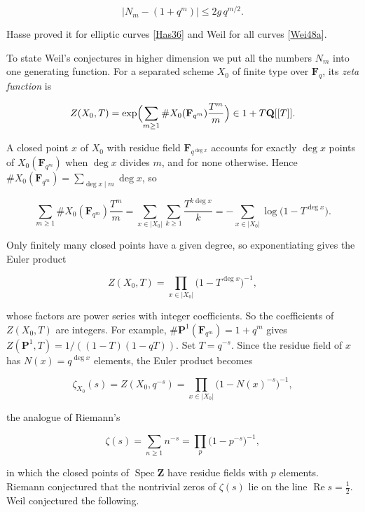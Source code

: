 \documentclass[11pt]{article}
\begin{document}
\[
|N_m-(1+q^m)|\le 2g\,q^{m/2}.
\]

Hasse proved it for elliptic curves [\hyperref[bp21]{Has36}] and Weil for all curves [\hyperref[bp22]{Wei48a}].

To state Weil's conjectures in higher dimension we put all the numbers \(N_m\) into one generating function. For a separated scheme \(X_0\) of finite type over \(\mathbf F_q\), its \emph{zeta function} is

\[
Z(X_0,T)=\exp\Bigl(\sum_{m\ge 1}\#X_0(\mathbf F_{q^m})\frac{T^m}{m}\Bigr)
\in 1+T\mathbf Q[[T]].
\]

A closed point \(x\) of \(X_0\) with residue field \(\mathbf F_{q^{\deg x}}\) accounts for exactly \(\deg x\) points of \(X_0(\mathbf F_{q^m})\) when \(\deg x\) divides \(m\), and for none otherwise. Hence \(\#X_0(\mathbf F_{q^m})=\sum_{\deg x\mid m}\deg x\), so

\[
\sum_{m\ge1}\#X_0(\mathbf F_{q^m})\frac{T^m}{m}
=\sum_{x\in|X_0|}\sum_{k\ge1}\frac{T^{k\deg x}}{k}
=-\sum_{x\in|X_0|}\log\bigl(1-T^{\deg x}\bigr).
\]

Only finitely many closed points have a given degree, so exponentiating gives the Euler product

\[
Z(X_0,T)=\prod_{x\in|X_0|}\bigl(1-T^{\deg x}\bigr)^{-1},
\]

whose factors are power series with integer coefficients. So the coefficients of \(Z(X_0,T)\) are integers. For example, \(\#\mathbf P^1(\mathbf F_{q^m})=1+q^m\) gives \(Z(\mathbf P^1,T)=1/((1-T)(1-qT))\). Set \(T=q^{-s}\). Since the residue field of \(x\) has \(N(x)=q^{\deg x}\) elements, the Euler product becomes

\[
\zeta_{X_0}(s)=Z(X_0,q^{-s})=\prod_{x\in|X_0|}\bigl(1-N(x)^{-s}\bigr)^{-1},
\]

the analogue of Riemann's

\[
\zeta(s)=\sum_{n\ge1}n^{-s}=\prod_{p}\bigl(1-p^{-s}\bigr)^{-1},
\]

in which the closed points of \(\operatorname{Spec}\mathbf Z\) have residue fields with \(p\) elements. Riemann conjectured that the nontrivial zeros of \(\zeta(s)\) lie on the line \(\operatorname{Re}s=\tfrac12\). Weil conjectured the following.
\end{document}
